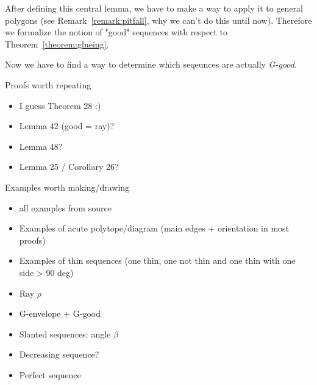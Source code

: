 After defining this central lemma, we have to make a way to apply it to general polygons (see Remark~\ref{remark:pitfall}, why we can't do this until now).
Therefore we formalize the notion of "good" sequences with respect to Theorem~\ref{theorem:glueing}.

\begin{definition}[G-envelope]
\end{definition}

\begin{definition}[G-good]
\end{definition}

Now we have to find a way to determine which seqeunces are actually \emph{G-good}.
\begin{lemma}
\end{lemma}




Proofs worth repeating
\begin{itemize}
  \item I guess Theorem 28 :)
  \item Lemma 42 (good = ray)?
  \item Lemma 48?
  \item Lemma 25 / Corollary 26?
\end{itemize}

Examples worth making/drawing
\begin{itemize}
  \item all examples from source
  \item Examples of acute polytope/diagram (main edges + orientation in most proofs)
  \item Examples of thin sequences (one thin, one not thin and one thin with one side > 90 deg)
  \item Ray $\rho$
  \item G-envelope + G-good
  \item Slanted sequences: angle $\beta$
  \item Decreasing sequence?
  \item Perfect sequence
\end{itemize}

